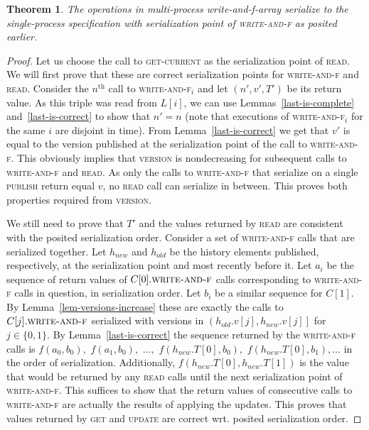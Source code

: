 \documentclass[a4paper,11pt]{article}
\newtheorem{theorem}{Theorem}
\newcommand{\fn}[1]{\textsc{#1}}
\begin{document}
\begin{theorem}
	The operations in multi-process write-and-f-array serialize to the single-process specification with serialization point of \fn{write-and-f} as posited earlier.
\end{theorem}
\begin{proof}
	Let us choose the call to \fn{get-current} as the serialization point of \fn{read}. 
	We will first prove that these are correct serialization points for \fn{write-and-f} and \fn{read}.
	Consider the $n^{\text{th}}$ call to \fn{write-and-f$_i$} and let $(n', v', T')$ be its return value. As this triple was read from $L[i]$, we can use Lemmas~\ref{last-is-complete} and~\ref{last-is-correct} to show that
	$n' = n$ (note that executions of \fn{write-and-f$_i$} for the same $i$ are disjoint in time). From Lemma~\ref{last-is-correct} we get that $v'$ is equal to the
	version published at the serialization point of the call to \fn{write-and-f}. This obviously implies that \fn{version} is nondecreasing for subsequent calls to \fn{write-and-f} and \fn{read}.
	As only the calls to \fn{write-and-f} that serialize on a single \fn{publish} return equal $v$, no \fn{read} call can serialize in between. This proves both properties required from \fn{version}.

	We still need to prove
		that $T'$ and the values returned by \fn{read} are consistent with the posited serialization order.
		Consider a set of \fn{write-and-f} calls that are serialized together. Let $h_{new}$ and $h_{old}$ be the history elements published, respectively, at the serialization point and most recently before it. Let $a_i$ be the sequence of return values
	of $C[0].\fn{write-and-f}$ calls corresponding to \fn{write-and-f} calls in question, in serialization order. Let $b_i$ be a similar sequence for $C[1]$. By Lemma~\ref{lem-versions-increase} these are exactly the calls to
	$C[j].\fn{write-and-f}$ serialized with versions in $\left(h_{old}.v[j], h_{new}.v[j]\right]$ for $j \in \{0, 1\}$. By Lemma~\ref{last-is-correct} the sequence returned
by the \fn{write-and-f} calls is $f(a_0, b_0), $ $f(a_1, b_0),$ $\ldots, $ $f(h_{new}.T[0], b_0), $ $f(h_{new}.T[0], b_1), \ldots$ in the order of serialization. 
Additionally, $f(h_{new}.T[0], h_{new}.T[1])$ is the value that would be returned by any \fn{read} calls until the next serialization point of \fn{write-and-f}.
This suffices to show that the return values of consecutive calls to \fn{write-and-f} are actually the results of applying the updates.
This proves that values returned by \fn{get} and \fn{update} are correct wrt. posited serialization order.
	

\end{proof}
\end{document}
